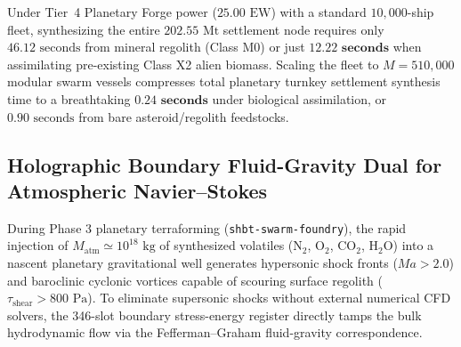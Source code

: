 \documentclass[11pt,onecolumn]{article}
\begin{document}
Under Tier~4 Planetary Forge power ($25.00\text{ EW}$) with a standard $10{,}000$-ship fleet, synthesizing the entire $202.55\text{ Mt}$ settlement node requires only $46.12\text{ seconds}$ from mineral regolith (Class M0) or just $\mathbf{12.22\text{ seconds}}$ when assimilating pre-existing Class X2 alien biomass. Scaling the fleet to $M = 510{,}000$ modular swarm vessels compresses total planetary turnkey settlement synthesis time to a breathtaking $\mathbf{0.24\text{ seconds}}$ under biological assimilation, or $0.90\text{ seconds}$ from bare asteroid/regolith feedstocks.

\FloatBarrier
\clearpage
\FloatBarrier
\subsection{Holographic Boundary Fluid-Gravity Dual for Atmospheric Navier--Stokes}
\label{sec:fluid_gravity}

During Phase 3 planetary terraforming (\texttt{shbt-swarm-foundry}), the rapid injection of $M_{\mathrm{atm}} \simeq 10^{18}\text{ kg}$ of synthesized volatiles ($\mathrm{N}_2$, $\mathrm{O}_2$, $\mathrm{CO}_2$, $\mathrm{H}_2\mathrm{O}$) into a nascent planetary gravitational well generates hypersonic shock fronts ($Ma > 2.0$) and baroclinic cyclonic vortices capable of scouring surface regolith ($\tau_{\mathrm{shear}} > 800\text{ Pa}$). To eliminate supersonic shocks without external numerical CFD solvers, the 346-slot boundary stress-energy register directly tamps the bulk hydrodynamic flow via the Fefferman--Graham fluid-gravity correspondence.
\end{document}
